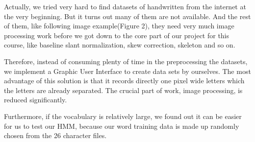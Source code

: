 
Actually, we tried very hard to find datasets of handwritten from the internet at the very beginning. But it turns out many of them are not available. And the rest of them, like following image example(Figure 2), they need very much image processing work before we got down to the core part of our project for this course, like baseline slant normalization, skew correction, skeleton and so on.

Therefore, instead of consuming plenty of time in the preprocessing the datasets, we implement a Graphic User Interface to create data sets by ourselves. The most advantage of this solution is that it records directly one pixel wide letters which the letters are already separated. The crucial part of work, image processing, is reduced significantly.

Furthermore, if the vocabulary is relatively large, we found out it can be easier for us to test our HMM, because our word training data is made up randomly chosen from the 26 character files.

